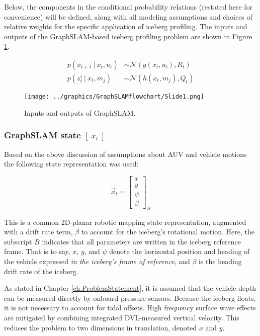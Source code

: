 Below, the components in the conditional probability relations (restated here for convenience) will be defined, along with all modeling assumptions and choices of relative weights for the specific application of iceberg profiling. The inputs and outputs of the GraphSLAM-based iceberg profiling problem are shown in Figure \ref{fig:GraphSLAMIO}.

\begin{align}
p\left(x_{t+1}~|~x_t,u_t\right) & \sim \mathcal{N}\left(g(x_t,u_t), R_t\right) \\
p\left(z^i_{t}~|~x_t,m_j\right) & \sim \mathcal{N}\left(h(x_t,m_j), Q_t\right)
\end{align}

\begin{figure}[htb]
   \centering
   \texttt{[image: ../graphics/GraphSLAMflowchart/Slide1.png]} %
   \caption{Inputs and outputs of GraphSLAM.}
   \label{fig:GraphSLAMIO}
\end{figure}

\subsubsection{GraphSLAM state $\left[~x_t~\right]$}

Based on the above discussion of assumptions about AUV and vehicle motions the following state representation was used:

\begin{equation}
\label{eq.state}
\vec{x}_t= \left[\begin{array}{c}
                     x \\ y \\ \psi \\ \beta 
                     \end{array}\right]_B
\end{equation}

This is a common 2D-planar robotic mapping state representation, augmented with a drift rate term, $\beta$ to account for the iceberg's rotational motion. Here, the subscript $B$ indicates that all parameters are written in the iceberg reference frame. That is to say, $x$, $y$, and $\psi$ denote the horizontal position and heading of the vehicle expressed \emph{in the iceberg's frame of reference}, and $\beta$ is the heading drift rate of the iceberg. 

As stated in Chapter \ref{ch.ProblemStatement}, it is assumed that the vehicle depth can be measured directly by onboard pressure sensors. Because the iceberg floats, it is not necessary to account for tidal offsets. High frequency surface wave effects are mitigated by combining integrated DVL-measured vertical velocity. This reduces the problem to two dimensions in translation, denoted $x$ and $y$. 


